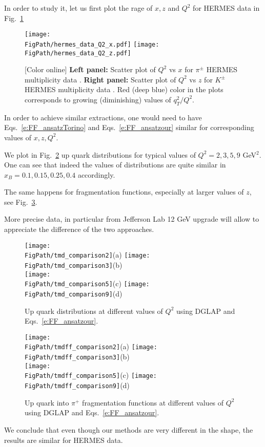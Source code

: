 \documentclass[final,3p,times,onecolumn,sort&compress,hidelinks]{elsarticle}
\newcommand{\xbj}{x_B}
\newcommand*{\FigPath}{../Figs/}%
\begin{document}
In order to study it, let us first plot the rage of $x,z$ and $Q^2$ for HERMES data in Fig.~\ref{Fig:hermes_data_Q2}
\begin{figure}[htb!]
\centering
\texttt{[image: \\FigPath/hermes\_data\_Q2\_x.pdf]}
\texttt{[image: \\FigPath/hermes\_data\_Q2\_z.pdf]}
\caption{\label{Fig:hermes_data_Q2}
[Color online] {\bf Left panel:} Scatter plot of $Q^2$ vs $x$ for $\pi^\pm$ HERMES multiplicity data . {\bf Right panel:} 
Scatter plot of $Q^2$ vs $z$ for $K^\pm$ HERMES multiplicity data .  Red (deep blue) color in the plots corresponds to growing (diminishing) values of $q_T^2/Q^2$.
}
\end{figure}

In order to achieve similar extractions, one would need to have Eqs.~\eqref{e:FF_ansatzTorino} and Eqs.~\eqref{e:FF_ansatzour} similar for corresponding values of $x,z,Q^2$.

We plot in Fig.~\ref{Fig:comparison} up quark distributions for typical values of $Q^2=2,3,5,9$ GeV$^2$.
One can see that indeed the values of distributions are quite similar in $\xbj = 0.1, 0.15, 0.25, 0.4$ accordingly.

The same happens for fragmentation functions, especially at larger values of $z$, see Fig.~\ref{Fig:comparison_ff}.

More precise data, in particular from Jefferson Lab 12 GeV upgrade will allow to appreciate the difference of the two approaches.
\begin{figure}[htb!]
\centering
\texttt{[image: \\FigPath/tmd\_comparison2]}{\tiny(a)}%
\texttt{[image: \\FigPath/tmd\_comparison3]}{\tiny(b)}\\%
\texttt{[image: \\FigPath/tmd\_comparison5]}{\tiny(c)}%
\texttt{[image: \\FigPath/tmd\_comparison9]}{\tiny(d)}%
\caption{\label{Fig:comparison}
Up quark distributions  at different values of $Q^2$ using DGLAP and Eqs.~\ref{e:FF_ansatzour}.
}
\end{figure}

\begin{figure}[htb!]
\centering
\texttt{[image: \\FigPath/tmdff\_comparison2]}{\tiny(a)}%
\texttt{[image: \\FigPath/tmdff\_comparison3]}{\tiny(b)}\\%
\texttt{[image: \\FigPath/tmdff\_comparison5]}{\tiny(c)}%
\texttt{[image: \\FigPath/tmdff\_comparison9]}{\tiny(d)}%
\caption{\label{Fig:comparison_ff}
Up quark into $\pi^+$ fragmentation functions at different values of $Q^2$ using DGLAP and Eqs.~\ref{e:FF_ansatzour}.
}
\end{figure}

We conclude that even though our methods are very different in the shape, the results are similar for HERMES data.





\end{document}
